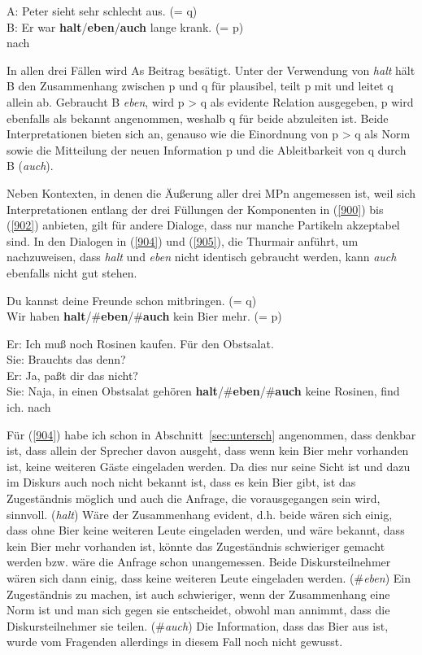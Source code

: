{\begin{exe}
	\ex\label{903}
	A: Peter sieht sehr schlecht aus. (= q)\\
	B: Er war \textbf{halt}/\textbf{eben}/\textbf{auch} lange krank. (= p)\\
	\hbox{}\hfill\hbox{nach \citet[340]{Karagjosova2003}}
\end{exe}
In allen drei Fällen wird As Beitrag besätigt. Unter der Verwendung von \textit{halt} hält B den Zusammenhang zwischen p und q für plausibel, teilt p mit und leitet q allein ab. Gebraucht B \textit{eben}, wird p > q als evidente Relation ausgegeben, p wird ebenfalls als bekannt angenommen, weshalb q für beide abzuleiten ist. Beide Interpretationen bieten sich an, genauso wie die Einordnung von p > q als Norm sowie die Mitteilung der neuen Information p und die Ableitbarkeit von q durch B (\textit{auch}). 

Neben Kontexten, in denen die Äußerung aller drei MPn angemessen ist, weil sich Interpretationen entlang der drei Füllungen der Komponenten in (\ref{900}) bis (\ref{902}) anbieten, gilt für andere Dialoge, dass nur manche Partikeln akzeptabel sind. In den Dialogen in (\ref{904}) und (\ref{905}), die Thurmair anführt, um nachzuweisen, dass \textit{halt} und \textit{eben} nicht identisch gebraucht werden, kann \textit{auch} ebenfalls nicht gut stehen.

\begin{exe}
	\ex\label{904}
	Du kannst deine Freunde schon mitbringen. (= q)\\
	Wir haben \textbf{halt}/\#\textbf{eben}/\#\textbf{auch} kein Bier mehr. (= p)
\end{exe}

\begin{exe}
	\ex\label{905}
	Er: Ich muß noch Rosinen kaufen. Für den Obstsalat.\\
	Sie: Brauchts das denn?\\
	Er: Ja, paßt dir das nicht?\\
	Sie: Naja, in einen Obstsalat gehören \textbf{halt}/\#\textbf{eben}/\#\textbf{auch} keine Rosinen, find ich.
	\hfill\hbox{nach \citet[124]{Thurmair1989}}
\end{exe}
Für (\ref{904}) habe ich schon in Abschnitt~\ref{sec:untersch} angenommen, dass denkbar ist, dass allein der Sprecher davon ausgeht, dass wenn kein Bier mehr vorhanden ist, keine weiteren Gäste eingeladen werden. Da dies nur seine Sicht ist und dazu im Diskurs auch noch nicht bekannt ist, dass es kein Bier gibt, ist das Zugeständnis möglich und auch die Anfrage, die vorausgegangen sein wird, sinnvoll. (\textit{halt}) Wäre der Zusammenhang evident, d.h. beide wären sich einig, dass ohne Bier keine weiteren Leute eingeladen werden, und wäre bekannt, dass kein Bier mehr vorhanden ist, könnte das Zugeständnis schwieriger gemacht werden bzw. wäre die Anfrage schon unangemessen.  Beide Diskursteilnehmer wären sich dann einig, dass keine weiteren Leute eingeladen werden. (\#\textit{eben}) Ein Zugeständnis zu machen, ist auch schwieriger, wenn der Zusammenhang eine Norm ist und man sich gegen sie entscheidet, obwohl man annimmt, dass die Diskursteilnehmer sie teilen. (\#\textit{auch}) Die Information, dass das Bier aus ist, wurde vom Fragenden allerdings in diesem Fall noch nicht gewusst. 

}
